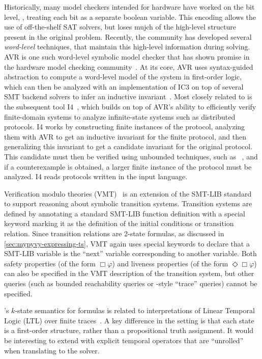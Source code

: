 Historically, many model checkers intended for hardware have worked on the bit level,
\ie, treating each bit as a separate boolean variable.
%
This encoding allows the use of off-the-shelf SAT solvers,
but loses mujch of the high-level structure present in the original problem.
%
Recently, the community has developed several \emph{word-level} techniques,
that maintain this high-level information during solving.
%
AVR is one such word-level symbolic model checker
that has shown promise in the hardware model checking community~\cite{goel-avr}.
%
At its core, AVR uses syntax-guided abstraction to compute a
word-level model of the system in first-order logic,
which can then be analyzed with an implementation of IC3 on top of several SMT backend solvers
to infer an inductive invariant~\cite{bradley-ic3}.
%
Most closely related to \mypyvy is the subsequent tool I4~\cite{i4},
which builds on top of AVR's ability to efficiently verify finite-domain systems
to analyze infinite-state systems such as distributed protocols.
%
I4 works by constructing finite instances of the protocol,
analyzing them with AVR to get an inductive invariant for the finite protocol,
and then generalizing this invariant
to get a candidate invariant for the original protocol.
%
This candidate must then be verified using unbounded techniques,
such as \ivy~\cite{Padon-al:PLDI16},
and if a counterexample is obtained,
a larger finite instance of the protocol must be analyzed.
%
I4 reads protocols written in the \ivy input language.

Verification modulo theories (VMT)~\cite{nuxmv-user-manual,vmt-website}
is an extension of the SMT-LIB standard~\cite{smtlib-standard}
to support reasoning about symbolic transition systems.
%
Transition systems are defined by annotating a standard SMT-LIB function definition
with a special keyword marking it as the definition of the
initial conditions or transition relation.
%
Since transition relations are 2-state formulas,
as discussed in \cref{sec:mypyvy-expressing-ts},
VMT again uses special keywords to declare that a SMT-LIB variable is
the ``next'' variable corresponding to another variable.
%
Both safety properties (of the form $\Box\varphi$) and
liveness properties (of the form $\Diamond\Box\varphi$)
can also be specified in the VMT description of the transition system,
but other queries (such as bounded reachability queries or
\mypyvy-style ``trace'' queries) cannot be specified.

\mypyvy's $k$-state semantics for formulas is
related to interpretations of Linear Temporal Logic (LTL)
over finite traces~\cite{vardi-ltl-finite}.
%
A key difference in the \mypyvy setting is that
each state is a first-order structure,
rather than a propositional truth assignment.
%
It would be interesting to extend \mypyvy
with explicit temporal operators that are ``unrolled''
when translating to the solver.

